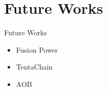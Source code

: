 \section{Future Works}

\begin{frame}{Future Works}
    \begin{itemize}
        \item Fusion Power
        \item TentaChain
        \item AOB
    \end{itemize}
\end{frame}

